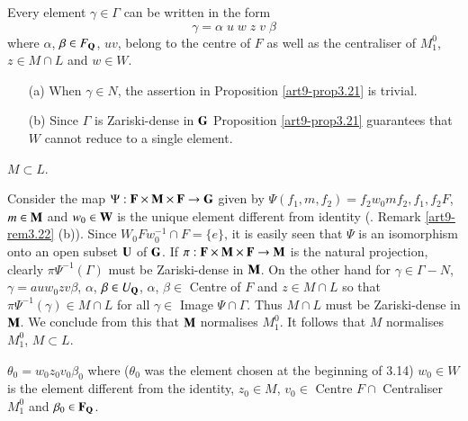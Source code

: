 \setcounter{definition}{20}
\begin{proposition}\label{art9-prop3.21}
Every element $\gamma \in \Gamma$ can be written in the form 
\begin{equation*}
\gamma = \alpha \; u \; w \; z \; v \; \beta \tag*{($\ast$)}
\end{equation*}
where $\alpha$, $\beta \in F_{\mathbf{Q}}$, $u v$, belong to the centre of $F$ as well as the centraliser of $M^0_1$, $z \in M \cap L$ and $w \in W$.
\end{proposition}


\begin{remarks}\label{art9-rem3.22}
\begin{itemize}
\item[(a)] When $\gamma \in N$, the assertion in Proposition \ref{art9-prop3.21} is trivial.

\item[(b)] Since $\Gamma$ is Zariski-dense in $\mathbf{G}$ Proposition \ref{art9-prop3.21} guarantees that $W$ cannot reduce to a single element.
\end{itemize}
\end{remarks}

\begin{coro}\label{art9-coro3.23}
$M \subset L$.
\end{coro}

\begin{numproof}\label{art9-numproof3.24}
Consider the map $\Psi : \mathbf{F} \times \mathbf{M} \times \mathbf{F} \to \mathbf{G}$ given by $\Psi (f_1, m, f_2) = f_2 w_0 m f_2, f_1, f_2 F$, $m \in \mathbf{M}$ and $w_0 \in \mathbf{W}$ is the unique element different from identity  (\cf. Remark \ref{art9-rem3.22} (b)). Since $W_0 F w_0^{-1} \cap F = \{e\}$, it is easily seen that $\Psi$ is an isomorphism onto an open subset $\mathbf{U}$ of $\mathbf{G}$. If $\pi : \mathbf{F} \times \mathbf{M} \times \mathbf{F} \to \mathbf{M}$ is the natural projection, clearly $\pi \Psi^{-1}(\Gamma)$ must be Zariski-dense in $\mathbf{M}$. On the other hand for $\gamma \in \Gamma - N$, $\gamma = a u w_0z v \beta$, $\alpha$, $\beta \in U_{\mathbf{Q}}$, $\alpha$, $\beta \in $ Centre of $F$ and $z \in M \cap L$ so that $\pi \Psi^{-1} (\gamma) \in M \cap L$ for all $\gamma \in $ Image $\Psi \cap \Gamma$. Thus $M \cap L$ must be Zariski-dense in $\mathbf{M}$. We conclude from this that $\mathbf{M}$ normalises $M^0_1$. It follows that $M$ normalises $M^0_1$, \ie $M \subset L$.
\end{numproof}

\begin{coro}\label{art9-coro3.25}
$\theta_0 = w_0 z_0 v_0 \beta_0$ where ($\theta_0$ was the element chosen at the beginning of 3.14) $w_0 \in W$ is the element different from the identity, $z_0 \in M$, $v_0 \in $ Centre $F \cap $ Centraliser $M^0_1$ and $\beta_0 \in \mathbf{F}_{\mathbf{Q}}$.
\end{coro}

